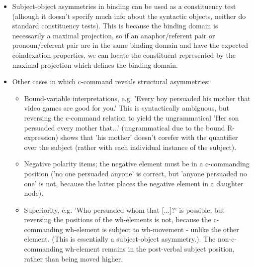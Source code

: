 \documentclass{article}
\begin{document}
\begin{itemize}
\begin{itemize}
    \end{itemize}
    \item Subject-object asymmetries in binding can be used as a constituency test (alhough it doesn't specify much info about the syntactic objects, neither do standard constituency tests). This is because the binding domain is necessarily a maximal projection, so if an anaphor/referent pair or pronoun/referent pair are in the same binding domain and have the expected coindexation properties, we can locate the constituent represented by the maximal projection which defines the binding domain.
    \item Other cases in which c-command reveals structural asymmetries:
    \begin{itemize}
        \item Bound-variable interpretations, e.g. 'Every boy persuaded his mother that video games are good for you.' This is syntactically ambiguous, but reversing the c-command relation to yield the ungrammatical 'Her son persuaded every mother that...' (ungrammatical due to the bound R-expression) shows that 'his mother' doesn't corefer with the quantifier over the subject (rather with each individual instance of the subject).
        \item Negative polarity items; the negative element must be in a c-commanding position ('no one persuaded anyone' is correct, but 'anyone persuaded no one' is not, because the latter places the negative element in a daughter node).
        \item Superiority, e.g. 'Who persuaded whom that [...]?' is possible, but reversing the positions of the wh-elements is not, because the c-commanding wh-element is subject to wh-movement - unlike the other element. (This is essentially a subject-object asymmetry.). The non-c-commanding wh-element remains in the post-verbal subject position, rather than being moved higher.
    \end{itemize}

\end{itemize}
\end{document}
